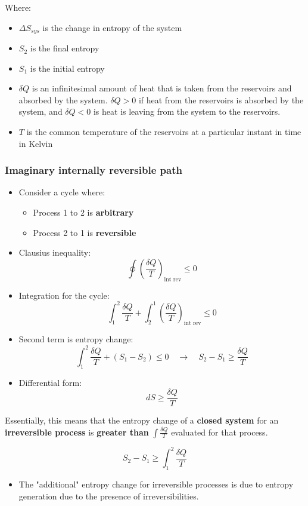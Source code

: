 \documentclass[11pt]{article}
\begin{document}
Where:
\begin{itemize}
\item \(\Delta S_{sys}\) is the change in entropy of the system
\item \(S_2\) is the final entropy
\item \(S_1\) is the initial entropy
\item \(\delta Q\) is an infinitesimal amount of heat that is taken from the reservoirs and absorbed by the system. \(\delta Q > 0\) if heat from the reservoirs is absorbed by the system, and \(\delta Q < 0\) is heat is leaving from the system to the reservoirs.
\item \(T\) is the common temperature of the reservoirs at a particular instant in time in Kelvin
\end{itemize}

 \newpage

\subsubsection{Imaginary internally reversible path}
\label{sec:org69c975a}
\begin{itemize}
\item Consider a cycle where:
\begin{itemize}
\item Process 1 to 2 is \textbf{arbitrary}
\item Process 2 to 1 is \textbf{reversible}
\end{itemize}
\item Clausius inequality:
\[\oint \left(\frac{\delta Q}{T} \right)_{\text{int rev}} \le 0\]
\item Integration for the cycle:
\[\int_1^2 \frac{\delta Q}{T} + \int_2^1 \left(\frac{\delta Q}{T} \right)_{\text{int rev}} \le 0\]
\item Second term is entropy change:
\[\int_1^2 \frac{\delta Q}{T} + (S_1 - S_2) \le 0 \quad \rightarrow \quad S_2 - S_1 \ge \frac{\delta Q}{T}\]
\item Differential form:
\[dS \ge \frac{\delta Q}{T}\]
\end{itemize}

Essentially, this means that the entropy change of a \textbf{closed system} for an \textbf{irreversible process} is \textbf{greater than} \(\int \frac{\delta Q}{T}\) evaluated for that process.

\[S_2 - S_1 \ge \int_1^2 \frac{\delta Q}{T}\]

\begin{itemize}
\item The "additional" entropy change for irreversible processes is due to entropy generation due to the presence of irreversibilities.
\end{itemize}
\end{document}
